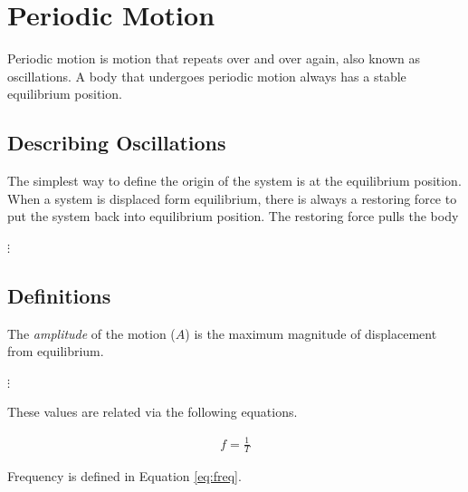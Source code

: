 \mainmatter
\setcounter{page}{1}

\lectureseries[\course]{\course}

\date{August 1, 2015}

\setaddress

\setcounter{lecture}{0}
\setcounter{chapter}{0}


\section{Periodic Motion}
Periodic motion is motion that repeats over and over again, also known as oscillations. A body that undergoes periodic motion always has a stable equilibrium position. 

\subsection{Describing Oscillations}
The simplest way to define the origin of the system is at the equilibrium position. When a system is displaced form equilibrium, there is always a restoring force to put the system back into equilibrium position. The restoring force pulls the body 
 

$\vdots$

\subsection{Definitions}

The \textit{amplitude} of the motion ($A$) is the maximum magnitude of displacement from equilibrium.

$\vdots$

These values are related via the following equations.

\begin{align}
\label{eq:freq}
f = \frac{1}{T} 
\end{align}

Frequency is defined in Equation \ref{eq:freq}.

